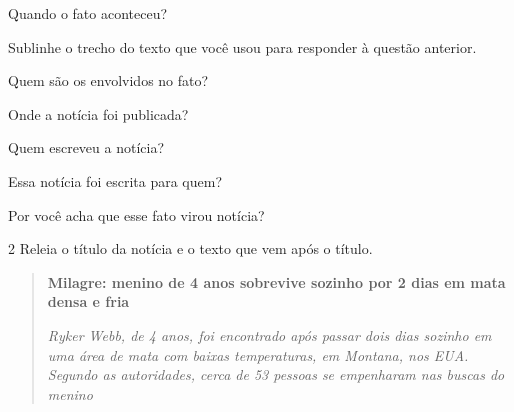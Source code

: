 \begin{escolha}
\begin{escolha}
\begin{escolha}

\item Quando o fato aconteceu?


\item
  Sublinhe o trecho do texto que você usou para responder à questão anterior.


\item Quem são os envolvidos no fato?


\item Onde a notícia foi publicada?


\item Quem escreveu a notícia?


\item Essa notícia foi escrita para quem?


\item Por você acha que esse fato virou notícia?

\end{escolha}

\num{2} Releia o título da notícia e o texto que vem após o título.

\begin{quote}
\textbf{Milagre: menino de 4 anos sobrevive sozinho por 2 dias em mata densa e fria}

\emph{Ryker Webb, de 4 anos, foi encontrado após passar dois dias
sozinho em uma área de mata com baixas temperaturas, em Montana, nos
EUA. Segundo as autoridades, cerca de 53 pessoas se empenharam nas
buscas do menino}
\end{quote}


\end{escolha}
\end{escolha}
